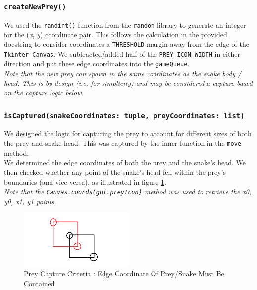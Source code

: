 \documentclass{article}
\begin{document}
\subsubsection{\texttt{createNewPrey()}}\label{sec:Prey_Generation}
We used the \texttt{randint()} function from the \texttt{random} library to generate an integer for the (\textit{x}, \textit{y}) coordinate pair. This follows the calculation
in the provided docstring to consider coordinates a \texttt{THRESHOLD} margin away from the edge of the \texttt{Tkinter Canvas}. We subtracted/added half of the \texttt{PREY\_ICON\_WIDTH}
in either direction and put these edge coordinates into the \texttt{gameQueue}. \\

\textit{Note that the new prey can spawn in the same coordinates as the snake body / head. This is by design (i.e. for simplicity) and may be considered a capture based on the capture logic below.}

\subsubsection{\texttt{isCaptured(snakeCoordinates: tuple, preyCoordinates: list)}}\label{sec:Prey_Capture}

We designed the logic for capturing the prey to account for different sizes of both the prey and snake head. This was captured by the inner function in the \texttt{move} method. \\

We determined the edge coordinates of both the prey and the snake's head. We then checked whether any point of the snake's head
fell within the prey's boundaries (and vice-versa), as illustrated in figure \ref{fig:PreyCapture}. \\

\textit{Note that the \texttt{Canvas.coords(gui.preyIcon)} method was used to retrieve the x0, y0, x1, y1 points.}

\begin{figure}[H]
   \centering
    \includegraphics[width=0.5\textwidth]{../PreyCapture.png}
    \caption{Prey Capture Criteria : Edge Coordinate Of Prey/Snake Must Be Contained}
    \label{fig:PreyCapture}
\end{figure}
\end{document}
